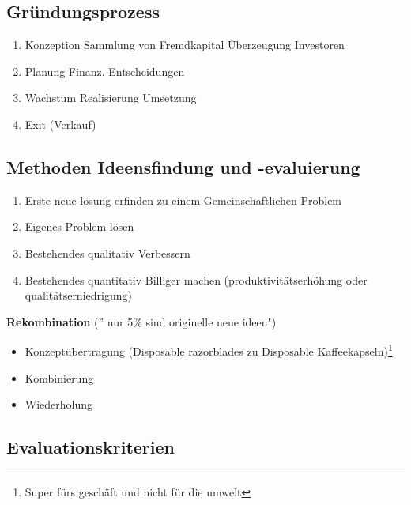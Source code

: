 \documentclass[a4paper]{article}
\begin{document}
    \subsection{Gründungsprozess}
    \begin{enumerate}
        \item Konzeption
            \subitem Sammlung von Fremdkapital Überzeugung Investoren
        \item Planung
            \subitem Finanz. Entscheidungen 
        \item Wachstum
            \subitem Realisierung Umsetzung 
        \item Exit (Verkauf)
    \end{enumerate}

    \subsection{Methoden Ideensfindung und -evaluierung}
    \begin{enumerate}
        \item Erste neue lösung erfinden zu einem Gemeinschaftlichen Problem
        \item Eigenes Problem lösen
        \item Bestehendes qualitativ Verbessern
        \item Bestehendes quantitativ Billiger machen (produktivitätserhöhung oder qualitätserniedrigung)
    \end{enumerate}

     \textbf{Rekombination} ('' nur 5\% sind originelle neue ideen")
    \begin{itemize}
        \item Konzeptübertragung (Disposable razorblades zu Disposable Kaffeekapseln)\footnote{Super fürs geschäft und nicht für die umwelt}
        \item Kombinierung
        \item Wiederholung
    \end{itemize}
\pagebreak
    \subsection{Evaluationskriterien}
    
\end{document}
